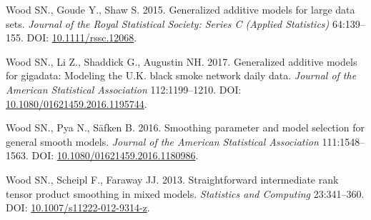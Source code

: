 \documentclass[12pt]{article}
\begin{document}
\hypertarget{ref-wood_generalized_2015}{}
Wood SN., Goude Y., Shaw S. 2015. Generalized additive models for large
data sets. \emph{Journal of the Royal Statistical Society: Series C
(Applied Statistics)} 64:139--155. DOI:
\href{https://doi.org/10.1111/rssc.12068}{10.1111/rssc.12068}.

\hypertarget{ref-Wood2017-iy}{}
Wood SN., Li Z., Shaddick G., Augustin NH. 2017. Generalized additive
models for gigadata: Modeling the U.K. black smoke network daily data.
\emph{Journal of the American Statistical Association} 112:1199--1210.
DOI:
\href{https://doi.org/10.1080/01621459.2016.1195744}{10.1080/01621459.2016.1195744}.

\hypertarget{ref-wood_smoothing_2016}{}
Wood SN., Pya N., Säfken B. 2016. Smoothing parameter and model
selection for general smooth models. \emph{Journal of the American
Statistical Association} 111:1548--1563. DOI:
\href{https://doi.org/10.1080/01621459.2016.1180986}{10.1080/01621459.2016.1180986}.

\hypertarget{ref-wood_straightforward_2012}{}
Wood SN., Scheipl F., Faraway JJ. 2013. Straightforward intermediate
rank tensor product smoothing in mixed models. \emph{Statistics and
Computing} 23:341--360. DOI:
\href{https://doi.org/10.1007/s11222-012-9314-z}{10.1007/s11222-012-9314-z}.
\end{document}

